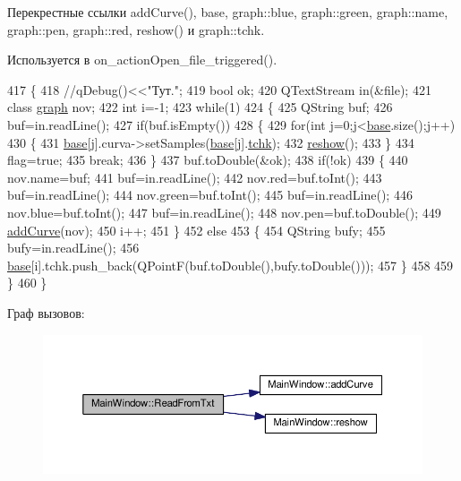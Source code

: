 Перекрестные ссылки add\+Curve(), base, graph\+::blue, graph\+::green, graph\+::name, graph\+::pen, graph\+::red, reshow() и graph\+::tchk.



Используется в on\+\_\+action\+Open\+\_\+file\+\_\+triggered().


\begin{DoxyCode}
417 \{
418     \textcolor{comment}{//qDebug()<<"Тут.";}
419     \textcolor{keywordtype}{bool} ok;
420     QTextStream in(&file);
421     \textcolor{keyword}{class }\hyperlink{classgraph}{graph} nov;
422     \textcolor{keywordtype}{int} i=-1;
423     \textcolor{keywordflow}{while}(1)
424     \{
425         QString buf;
426         buf=in.readLine();
427         \textcolor{keywordflow}{if}(buf.isEmpty())
428         \{
429             \textcolor{keywordflow}{for}(\textcolor{keywordtype}{int} j=0;j<\hyperlink{class_main_window_a3413d4508f4981518b1b8ebf3b29121e}{base}.size();j++)
430             \{
431                 \hyperlink{class_main_window_a3413d4508f4981518b1b8ebf3b29121e}{base}[j].curva->setSamples(\hyperlink{class_main_window_a3413d4508f4981518b1b8ebf3b29121e}{base}[j].\hyperlink{classgraph_afae7c6852c8de983693fb2fd108ed3c4}{tchk});
432                 \hyperlink{class_main_window_a24985964bdf5f59467dcc99749e06bdd}{reshow}();
433             \}
434             flag=\textcolor{keyword}{true};
435             \textcolor{keywordflow}{break};
436         \}
437         buf.toDouble(&ok);
438         \textcolor{keywordflow}{if}(!ok)
439         \{
440             nov.name=buf;
441             buf=in.readLine();
442             nov.red=buf.toInt();
443             buf=in.readLine();
444             nov.green=buf.toInt();
445             buf=in.readLine();
446             nov.blue=buf.toInt();
447             buf=in.readLine();
448             nov.pen=buf.toDouble();
449             \hyperlink{class_main_window_aa5c0998b1192bfab3ff83b02c42b2c67}{addCurve}(nov);
450             i++;
451         \}
452         \textcolor{keywordflow}{else}
453         \{
454             QString bufy;
455             bufy=in.readLine();
456             \hyperlink{class_main_window_a3413d4508f4981518b1b8ebf3b29121e}{base}[i].tchk.push\_back(QPointF(buf.toDouble(),bufy.toDouble()));
457         \}
458 
459     \}
460 \}
\end{DoxyCode}


Граф вызовов\+:\nopagebreak
\begin{figure}[H]
\begin{center}
\leavevmode
\includegraphics[width=350pt]{class_main_window_ac280af7b364789fa7b6e2274fb8a9e2a_cgraph}
\end{center}
\end{figure}




